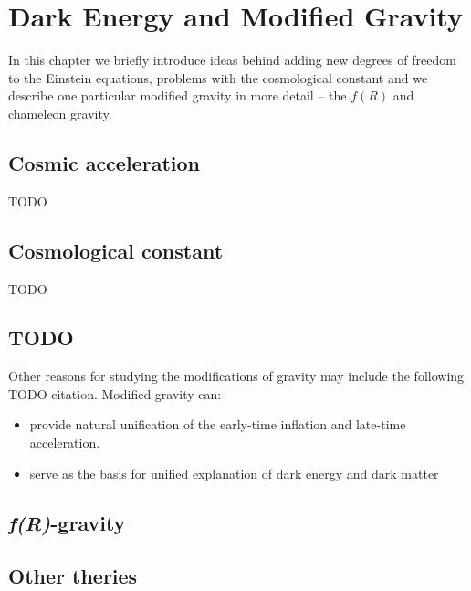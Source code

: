 \chapter{Dark Energy and Modified Gravity}
In this chapter we briefly introduce ideas behind adding new degrees of freedom to the Einstein equations, problems with the cosmological constant and we describe one particular modified gravity in more detail -- the $f(R)$ and chameleon gravity.
\section{Cosmic acceleration}
TODO

\section{Cosmological constant}
TODO

\section{TODO}
Other reasons for studying the modifications of gravity may include the following TODO citation. Modified gravity can:
\begin{itemize}
	\item provide natural unification of the early-time inflation and late-time acceleration.
	\item serve as the basis for unified explanation of dark energy and dark matter
\end{itemize}

\section{\textit{f(R)}-gravity}



\section{Other theries}